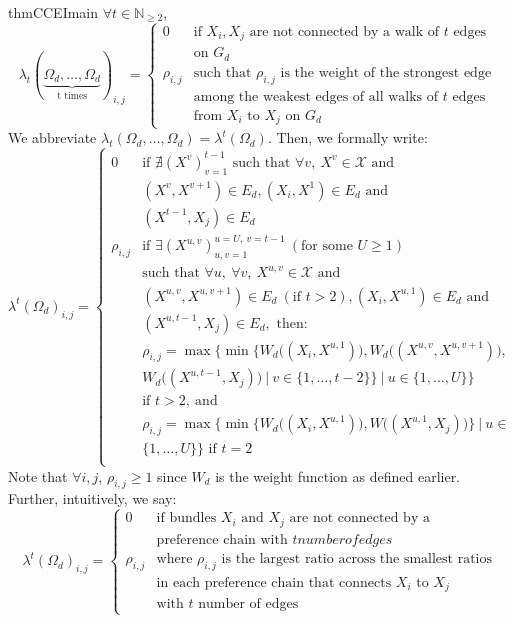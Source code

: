 \documentclass{article} %
\theoremstyle{style1}
\theoremstyle{style1}
\theoremstyle{example}
\begin{document}
\begin{restatable}{thm}{CCEImain}
\label{thm:CCEI_main}
$\forall t\in \mathbb{N}_{\geq2}$,
\[
  \lambda_t(\underbrace{\Omega_d,\ldots,\Omega_d}_\text{t times})_{i,j}=
  \begin{cases}
  0 & \textrm{if } X_i, X_j\textrm{ are not connected by a walk of }t \textrm{ edges} \\
  & \textrm{on }G_d \\
  \rho_{i,j} & \textrm{such that }\rho_{i,j}\textrm{ is the weight of the strongest edge } \\
  &\textrm{among the weakest edges of all walks of } t \textrm{ edges} \\
  & \textrm{from }X_i\textrm{ to }X_j \textrm{ on } G_d
  \end{cases}
\]
We abbreviate $\lambda_t(\Omega_d,\ldots,\Omega_d)=\lambda^t(\Omega_d)$. Then, we formally write:
\[
  \lambda^t(\Omega_d)_{i,j}=
  \begin{cases}
  0 & \textrm{if } \nexists (X^v)_{v=1}^{t-1} \textrm{ such that } \forall v,\ X^v\in\mathcal{X}\textrm{ and } \\
  & (X^v,X^{v+1})\in E_d, (X_i,X^1)\in E_d \textrm{ and } \\
  & (X^{t-1},X_j)\in E_d\\ 
  \rho_{i,j} & \textrm{if }\exists (X^{u,v})_{u,v=1}^{u=U,\ v=t-1}\ (\textrm{for some }U\geq1) \\
  & \textrm{such that }\forall u,\ \forall v,\ X^{u,v}\in\mathcal{X} \textrm{ and } \\
  & (X^{u,v},X^{u,v+1})\in E_d\ (\textrm{if }t>2), (X_i, X^{u,1})\in E_d \textrm{ and } \\
  & (X^{u,t-1},X_j)\in E_d, \textrm{ then: } \\
  & \rho_{i,j}=\max\Big\{\min\big\{W_d\big((X_i,X^{u,1})\big),W_d\big((X^{u,v},X^{u,v+1})\big), \\
  & W_d\big((X^{u,t-1},X_j)\big)\ |\ v\in\{1,\ldots,t-2\}\big\}\ |\ u\in\{1,\ldots,U\}\Big\} \\
  &\textrm{if } t>2,\ \textrm{and }\\
  &\rho_{i,j}=\max\Big\{\min\big\{W_d\big((X_i,X^{u,1})\big), W\big((X^{u,1},X_j)\big)\big\}\ |\ u\in\\
  &\{1,\ldots,U\}\Big\} \textrm{ if } t=2\\
  \end{cases}
\]
Note that $\forall i,j$, $\rho_{i,j}\geq1$ since $W_d$ is the weight function as defined earlier. Further, intuitively, we say:
\[
  \lambda^t(\Omega_d)_{i,j}=
  \begin{cases}
  0 & \textrm{if bundles }X_i \textrm{ and }X_j\textrm{ are not connected by a} \\
  & \textrm{preference chain with } t { number of edges}\\
  \rho_{i,j} & \textrm{where }\rho_{i,j}\textrm{ is the largest ratio across the smallest ratios} \\
  & \textrm{in each preference chain that connects } X_i\textrm{ to } X_j \\ 
  & \textrm{with }t\textrm{ number of edges }
  \end{cases}
\]
\end{restatable}
\end{document}
